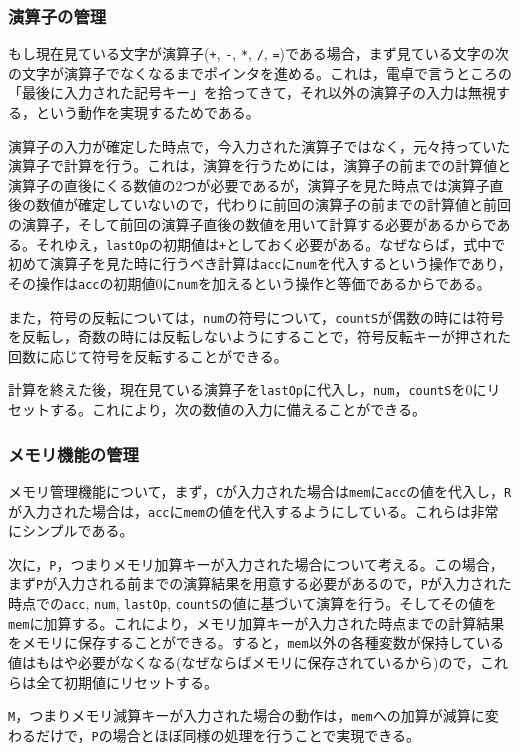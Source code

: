 \documentclass[a4paper]{jsarticle}
\newcommand{\var}[1]{\texttt{#1}}
\begin{document}
\subsubsection{演算子の管理}
もし現在見ている文字が演算子(\var{+}, \var{-}, \var{*}, \var{/}, \var{=})である場合，まず見ている文字の次の文字が演算子でなくなるまでポインタを進める。これは，電卓で言うところの「最後に入力された記号キー」を拾ってきて，それ以外の演算子の入力は無視する，という動作を実現するためである。

演算子の入力が確定した時点で，今入力された演算子ではなく，元々持っていた演算子で計算を行う。これは，演算を行うためには，演算子の前までの計算値と演算子の直後にくる数値の2つが必要であるが，演算子を見た時点では演算子直後の数値が確定していないので，代わりに前回の演算子の前までの計算値と前回の演算子，そして前回の演算子直後の数値を用いて計算する必要があるからである。それゆえ，\var{lastOp}の初期値は\var{+}としておく必要がある。なぜならば，式中で初めて演算子を見た時に行うべき計算は\var{acc}に\var{num}を代入するという操作であり，その操作は\var{acc}の初期値0に\var{num}を加えるという操作と等価であるからである。

また，符号の反転については，\var{num}の符号について，\var{countS}が偶数の時には符号を反転し，奇数の時には反転しないようにすることで，符号反転キーが押された回数に応じて符号を反転することができる。

計算を終えた後，現在見ている演算子を\var{lastOp}に代入し，\var{num}，\var{countS}を0にリセットする。これにより，次の数値の入力に備えることができる。

\subsubsection{メモリ機能の管理}
メモリ管理機能について，まず，\var{C}が入力された場合は\var{mem}に\var{acc}の値を代入し，\var{R}が入力された場合は，\var{acc}に\var{mem}の値を代入するようにしている。これらは非常にシンプルである。

次に，\var{P}，つまりメモリ加算キーが入力された場合について考える。この場合，まず\var{P}が入力される前までの演算結果を用意する必要があるので，\var{P}が入力された時点での\var{acc}, \var{num}, \var{lastOp}, \var{countS}の値に基づいて演算を行う。そしてその値を\var{mem}に加算する。これにより，メモリ加算キーが入力された時点までの計算結果をメモリに保存することができる。すると，\var{mem}以外の各種変数が保持している値はもはや必要がなくなる(なぜならばメモリに保存されているから)ので，これらは全て初期値にリセットする。

\var{M}，つまりメモリ減算キーが入力された場合の動作は，\var{mem}への加算が減算に変わるだけで，\var{P}の場合とほぼ同様の処理を行うことで実現できる。
\end{document}
